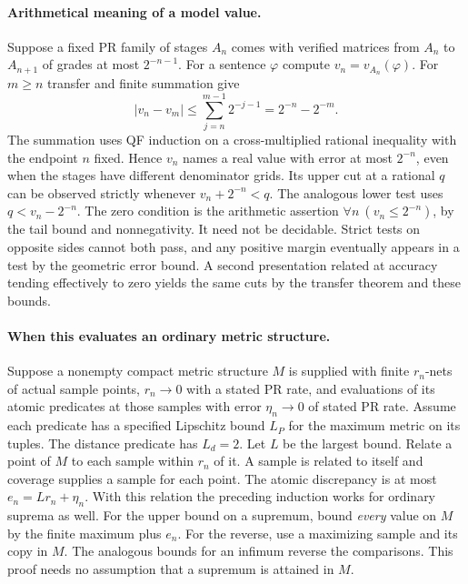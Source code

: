 \paragraph{Arithmetical meaning of a model value.}
Suppose a fixed PR family of stages $A_n$ comes with verified matrices
from $A_n$ to $A_{n+1}$ of grades at most $2^{-n-1}$. For a sentence
$\varphi$ compute $v_n=v_{A_n}(\varphi)$. For $m\geq n$ transfer and finite
summation give
\[
 |v_n-v_m|\leq\sum_{j=n}^{m-1}2^{-j-1}=2^{-n}-2^{-m}.
\]
The summation uses QF induction on a cross-multiplied rational inequality
with the endpoint $n$ fixed. Hence $v_n$ names a real value with error at
most $2^{-n}$, even when the stages have different denominator grids.
Its upper cut at a rational $q$ can be observed strictly whenever
$v_n+2^{-n}<q$. The analogous lower test uses $q<v_n-2^{-n}$.
The zero condition is the arithmetic assertion
$\forall n\ (v_n\leq 2^{-n})$, by the tail bound and nonnegativity.
It need not be decidable. Strict tests on opposite sides cannot both pass,
and any positive margin eventually appears in a test by the geometric
error bound. A second presentation related at accuracy tending effectively
to zero yields the same cuts by the transfer theorem and these bounds.

\paragraph{When this evaluates an ordinary metric structure.}
Suppose a nonempty compact metric structure $M$ is supplied with finite
$r_n$-nets of actual sample points, $r_n\to0$ with a stated PR rate,
and evaluations of its atomic predicates at those samples with error
$\eta_n\to0$ of stated PR rate. Assume each predicate has a specified
Lipschitz bound $L_P$ for the maximum metric on its tuples. The distance
predicate has $L_d=2$. Let $L$ be the largest bound. Relate a point of
$M$ to each sample within $r_n$ of it. A sample is related to itself and
coverage supplies a sample for each point. The atomic discrepancy is at
most $e_n=Lr_n+\eta_n$. With this relation the preceding induction works
for ordinary suprema as well. For the upper bound on a supremum, bound
\emph{every} value on $M$ by the finite maximum plus $e_n$. For the
reverse, use a maximizing sample and its copy in $M$. The analogous
bounds for an infimum reverse the comparisons. This proof needs no
assumption that a supremum is attained in $M$.

